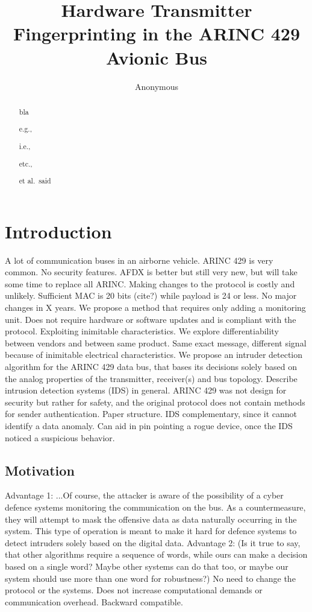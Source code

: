 \documentclass[conference]{IEEEtran}
\title{Hardware Transmitter Fingerprinting in the ARINC 429 Avionic Bus}
\author{Anonymous}
\begin{document}
\maketitle

\begin{abstract}
    bla
    
    e.g., 
    
    i.e.,
    
    etc.,
    
    et al.\ said
    
\end{abstract}


\section{Introduction}
  A lot of communication buses in an airborne vehicle. ARINC 429 is very common. No security features. AFDX is better but still very new, but will take some time to replace all ARINC. Making changes to the protocol is costly and unlikely. Sufficient MAC is 20 bits (cite?) while payload is 24 or less. No major changes in X years. We propose a method that requires only adding a monitoring unit. Does not require hardware or software updates and is compliant with the protocol. Exploiting inimitable characteristics.
  We explore differentiability between vendors and between same product. Same exact message, different signal because of inimitable electrical characteristics.
  \color{gray}
  We propose an intruder detection algorithm for the ARINC 429 data bus, that bases its decisions solely based on the analog properties of the transmitter, receiver(s) and bus topology.
  \color{black}
  Describe intrusion detection systems (IDS) in general.
  ARINC 429 was not design for security but rather for safety, and the original protocol does not contain methods for sender authentication.
  Paper structure.
  IDS complementary, since it cannot identify a data anomaly. Can aid in pin pointing a rogue device, once the IDS noticed a suspicious behavior.

\subsection{Motivation}
  \color{gray}
  Advantage 1: ...Of course, the attacker is aware of the possibility of a cyber defence systems monitoring the communication on the bus. As a countermeasure, they will attempt to mask the offensive data as data naturally occurring in the system. This type of operation is meant to make it hard for defence systems to detect intruders solely based on the digital data. Advantage 2: (Is it true to say, that other algorithms require a sequence of words, while ours can make a decision based on a single word? Maybe other systems can do that too, or maybe our system should use more than one word for robustness?)
  No need to change the protocol or the systems. Does not increase computational demands or communication overhead.
  Backward compatible.
  \color{black}
\end{document}
